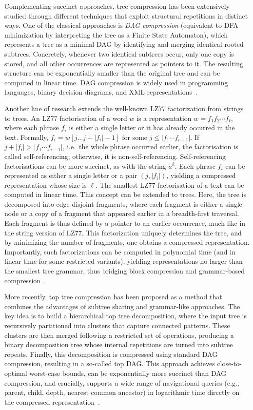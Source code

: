 Complementing succinct approaches, tree compression has been extensively studied through different techniques that exploit structural repetitions in distinct ways. One of the classical approaches is \emph{DAG compression} (equivalent to DFA minimization by interpreting the tree as a Finite State Automaton), which represents a tree as a minimal DAG by identifying and merging identical rooted subtrees. 
Concretely, whenever two identical subtrees occur, only one copy is stored, and all other occurrences are represented as pointers to it. 
The resulting structure can be exponentially smaller than the original tree and can be computed in linear time. DAG compression is widely used in programming languages, binary decision diagrams, and XML representations~\cite{billeTreeCompressionTop2015}.

Another line of research extends the well-known LZ77 factorization from strings to trees. An LZ77 factorisation of a word $w$ is a representation $w = f_1f_2 \cdots f_\ell$, where each phrase $f_i$ is either a single letter or it has already occurred in the text. Formally, $f_i = w[j \dots j + |f_i| - 1]$ for some $j \le |f_1 \cdots f_{i-1}|$. If $j + |f_i| > |f_1 \cdots f_{i-1}|$, i.e.\ the whole phrase occurred earlier, the factorisation is called self-referencing; otherwise, it is non-self-referencing. Self-referencing factorisations can be more succinct, as with the string $a^k$. Each phrase $f_i$ can be represented as either a single letter or a pair $(j, |f_i|)$, yielding a compressed representation whose size is $\ell$. The smallest LZ77 factorisation of a text can be computed in linear time. This concept can be extended to trees. Here, the tree is decomposed into edge-disjoint fragments, where each fragment is either a single node or a copy of a fragment that appeared earlier in a breadth-first traversal. Each fragment is thus defined by a pointer to an earlier occurrence, much like in the string version of LZ77. This factorization uniquely determines the tree, and by minimizing the number of fragments, one obtains a compressed representation. Importantly, such factorizations can be computed in polynomial time (and in linear time for some restricted variants), yielding representations no larger than the smallest tree grammar, thus bridging block compression and grammar-based compression~\cite{gawrychowskiLZ77FactorisationTrees2016}.

More recently, top tree compression has been proposed as a method that combines the advantages of subtree sharing and grammar-like approaches. The key idea is to build a hierarchical top tree decomposition, where the input tree is recursively partitioned into clusters that capture connected patterns. These clusters are then merged following a restricted set of operations, producing a binary decomposition tree whose internal repetitions are turned into subtree repeats. Finally, this decomposition is compressed using standard DAG compression, resulting in a so-called top DAG. This approach achieves close-to-optimal worst-case bounds, can be exponentially more succinct than DAG compression, and crucially, supports a wide range of navigational queries (e.g., parent, child, depth, nearest common ancestor) in logarithmic time directly on the compressed representation~\cite{billeTreeCompressionTop2015}.

